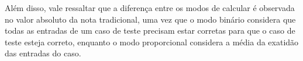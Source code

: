 Além disso, vale ressaltar que a diferença entre os modos de calcular é observada no valor absoluto da nota tradicional, uma vez que o modo binário considera que todas as entradas de um caso de teste precisam estar corretas para que o caso de teste esteja correto, enquanto o modo proporcional considera a média da exatidão das entradas do caso.

